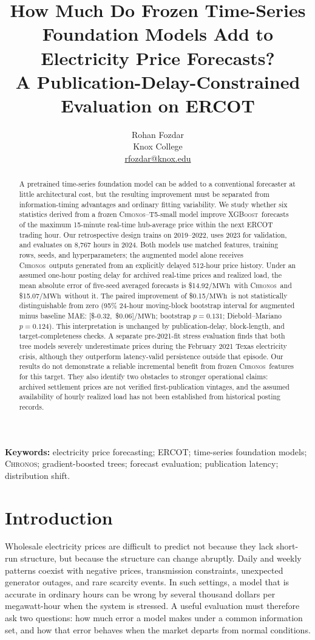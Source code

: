 \documentclass[11pt,letterpaper]{article}
\title{\bfseries How Much Do Frozen Time-Series Foundation Models Add to Electricity Price Forecasts?\\[0.25em]
\large A Publication-Delay-Constrained Evaluation on ERCOT}
\author{Rohan Fozdar\\[-0.1em]\normalsize Knox College\\[-0.1em]\normalsize \href{mailto:rfozdar@knox.edu}{rfozdar@knox.edu}}
\date{}
\newcommand{\MWh}{\ensuremath{\mathrm{MWh}}}
\newcommand{\Chronos}{\textsc{Chronos}}
\newcommand{\XGB}{\textsc{XGBoost}}
\begin{document}
\maketitle
\begin{abstract}
A pretrained time-series foundation model can be added to a conventional forecaster at little architectural cost, but the resulting improvement must be separated from information-timing advantages and ordinary fitting variability. We study whether six statistics derived from a frozen \Chronos--T5-small model improve \XGB\ forecasts of the maximum 15-minute real-time hub-average price within the next ERCOT trading hour. Our retrospective design trains on 2019--2022, uses 2023 for validation, and evaluates on 8,767 hours in 2024. Both models use matched features, training rows, seeds, and hyperparameters; the augmented model alone receives \Chronos\ outputs generated from an explicitly delayed 512-hour price history. Under an assumed one-hour posting delay for archived real-time prices and realized load, the mean absolute error of five-seed averaged forecasts is \$14.92/\MWh\ with \Chronos\ and \$15.07/\MWh\ without it. The paired improvement of \$0.15/\MWh\ is not statistically distinguishable from zero (95\% 24-hour moving-block bootstrap interval for augmented minus baseline MAE: [\$-0.32,\ \$0.06]/\MWh; bootstrap $p=0.131$; Diebold--Mariano $p=0.124$). This interpretation is unchanged by publication-delay, block-length, and target-completeness checks. A separate pre-2021-fit stress evaluation finds that both tree models severely underestimate prices during the February 2021 Texas electricity crisis, although they outperform latency-valid persistence outside that episode. Our results do not demonstrate a reliable incremental benefit from frozen \Chronos\ features for this target. They also identify two obstacles to stronger operational claims: archived settlement prices are not verified first-publication vintages, and the assumed availability of hourly realized load has not been established from historical posting records.
\end{abstract}

\noindent\textbf{Keywords:} electricity price forecasting; ERCOT; time-series foundation models; \Chronos; gradient-boosted trees; forecast evaluation; publication latency; distribution shift.

\section{Introduction}\label{sec:intro}
Wholesale electricity prices are difficult to predict not because they lack short-run structure, but because the structure can change abruptly. Daily and weekly patterns coexist with negative prices, transmission constraints, unexpected generator outages, and rare scarcity events. In such settings, a model that is accurate in ordinary hours can be wrong by several thousand dollars per megawatt-hour when the system is stressed. A useful evaluation must therefore ask two questions: how much error a model makes under a common information set, and how that error behaves when the market departs from normal conditions.
\end{document}
